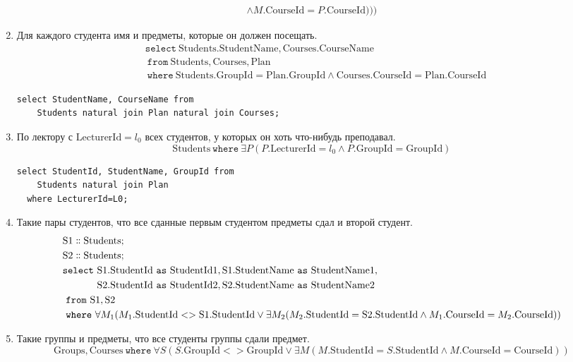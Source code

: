 \documentclass{article}
\newcommand{\Students}{\mathrm{Students}}
\newcommand{\Sq}{\mathrm{S1}}
\newcommand{\Sw}{\mathrm{S2}}
\newcommand{\StudentId}{\mathrm{StudentId}}
\newcommand{\StudentName}{\mathrm{StudentName}}
\newcommand{\Groups}{\mathrm{Groups}}
\newcommand{\GroupId}{\mathrm{GroupId}}
\newcommand{\Courses}{\mathrm{Courses}}
\newcommand{\CourseId}{\mathrm{CourseId}}
\newcommand{\CourseName}{\mathrm{CourseName}}
\newcommand{\Plan}{\mathrm{Plan}}
\newcommand{\LecturerId}{\mathrm{LecturerId}}
\newcommand{\select}{\mathtt{select}~}
\newcommand{\from}{~\mathtt{from}~}
\newcommand{\as}{~\mathtt{as}~}
\newcommand{\where}{~\mathtt{where}~}
\begin{document}
\begin{enumerate}
\begin{align*}
        \land M.\CourseId = P.\CourseId)))
    \end{align*}
    \item Для каждого студента имя и предметы, которые он должен посещать.
    \begin{align*}
        &\select \Students.\StudentName, \Courses.\CourseName \\
        &\from \Students, \Courses, \Plan \\
        &\where \Students.\GroupId = \Plan.\GroupId
            \land \Courses.\CourseId = \Plan.\CourseId
    \end{align*}
    \begin{verbatim}
select StudentName, CourseName from
    Students natural join Plan natural join Courses;
    \end{verbatim}
    \item По лектору с $\LecturerId=l_0$ всех студентов,
        у которых он хоть что-нибудь преподавал.
    \[
        \Students \where \exists P (P.\LecturerId = l_0
        \land P.\GroupId = \GroupId)
    \]
    \begin{verbatim}
select StudentId, StudentName, GroupId from
    Students natural join Plan
  where LecturerId=L0;
    \end{verbatim}
    \item Такие пары студентов,
        что все сданные первым студентом предметы сдал и второй студент.
    \begin{align*}
        &\Sq \dblcolon \Students; \\
        &\Sw \dblcolon \Students; \\
        &\select \Sq.\StudentId \as \mathrm{StudentId1},
                 \Sq.\StudentName \as \mathrm{StudentName1}, \\
        &\phantom{\select} \Sw.\StudentId \as \mathrm{StudentId2},
                           \Sw.\StudentName \as \mathrm{StudentName2} \\
        &\from \Sq, \Sw \\
        &\where \forall M_1 (M_1.\StudentId <> \Sq.\StudentId
            \lor \exists M_2 (M_2.\StudentId = \Sw.\StudentId
            \land M_1.\CourseId = M_2.\CourseId))
    \end{align*}
    \item Такие группы и предметы, что все студенты группы сдали предмет.
    \[
        \Groups, \Courses \where
        \forall S (S.\GroupId <> \GroupId
        \lor \exists M (M.\StudentId = S.\StudentId
        \land M.\CourseId = \CourseId))
    \]
\end{enumerate}
\end{document}
